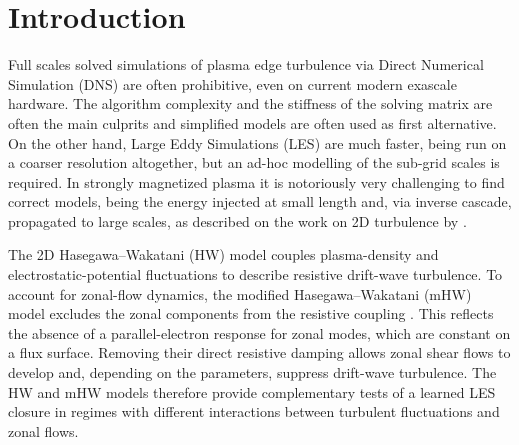 \documentclass[authoryear,preprint,review,12pt]{elsarticle}
\begin{document}
\section{Introduction}\label{sec:Introduction}

Full scales solved simulations of plasma edge turbulence via Direct Numerical Simulation (DNS) are often prohibitive, even on current modern exascale hardware. The algorithm complexity and the stiffness of the solving matrix are often the main culprits and simplified models are often used as first alternative. On the other hand, Large Eddy Simulations (LES) are much faster, being run on a coarser resolution altogether, but an ad-hoc modelling of the sub-grid scales is required. In strongly magnetized plasma it is notoriously very challenging to find correct models, being the energy injected at small length and, via inverse cascade, propagated to large scales, as described on the work on 2D turbulence by \citet{kraichnan_inertial_1967}.

The 2D Hasegawa--Wakatani (HW) model \citep{hasegawa_self-organization_1987} couples plasma-density and electrostatic-potential fluctuations to describe resistive drift-wave turbulence. To account for zonal-flow dynamics, the modified Hasegawa--Wakatani (mHW) model excludes the zonal components from the resistive coupling \citep{numata_bifurcation_2007}. This reflects the absence of a parallel-electron response for zonal modes, which are constant on a flux surface. Removing their direct resistive damping allows zonal shear flows to develop and, depending on the parameters, suppress drift-wave turbulence. The HW and mHW models therefore provide complementary tests of a learned LES closure in regimes with different interactions between turbulent fluctuations and zonal flows.
\end{document}
